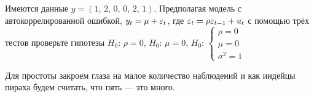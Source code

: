 \begin{problem}
Имеются данные $y=(1,\, 2,\, 0,\,  0,\, 2,\, 1)$. Предполагая модель с автокоррелированной ошибкой, $y_t=\mu+\varepsilon_t$, где $\varepsilon_t=\rho \varepsilon_{t-1}+u_t$ с помощью трёх тестов проверьте гипотезы
$H_0$: $\rho=0$,
$H_0$: $\mu=0$,
$H_0$: $\begin{cases}
\rho=0 \\
\mu = 0 \\
\sigma^2=1
\end{cases}$



\begin{sol}

Для простоты закроем глаза на малое количество наблюдений и как индейцы пираха будем считать, что пять --- это много.

\end{sol}
\end{problem}


